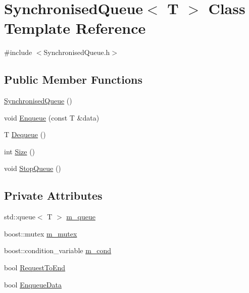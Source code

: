 \hypertarget{classSynchronisedQueue}{\section{\-Synchronised\-Queue$<$ \-T $>$ \-Class \-Template \-Reference}
\label{classSynchronisedQueue}
}


{\ttfamily \#include $<$\-Synchronised\-Queue.\-h$>$}

\subsection*{\-Public \-Member \-Functions}
\begin{DoxyCompactItemize}
\item 
\hyperlink{classSynchronisedQueue_af19aaa5e55bdcf1235f9fec42b8bd100}{\-Synchronised\-Queue} ()
\item 
void \hyperlink{classSynchronisedQueue_a57ab290483acce1df774ab57515c6fea}{\-Enqueue} (const \-T \&data)
\item 
\-T \hyperlink{classSynchronisedQueue_a9872d0bff96d46f32fe131454d17f1db}{\-Dequeue} ()
\item 
int \hyperlink{classSynchronisedQueue_ae1826dd6d56a0b1e07caed3a1215cd5a}{\-Size} ()
\item 
void \hyperlink{classSynchronisedQueue_aaf9850472417493364e6349f17558fac}{\-Stop\-Queue} ()
\end{DoxyCompactItemize}
\subsection*{\-Private \-Attributes}
\begin{DoxyCompactItemize}
\item 
std\-::queue$<$ \-T $>$ \hyperlink{classSynchronisedQueue_a838ae9b5d2b5ce8dd901aa7a03c79861}{m\-\_\-queue}
\item 
boost\-::mutex \hyperlink{classSynchronisedQueue_a94b11f8a9abb258e72162cc0988458ef}{m\-\_\-mutex}
\item 
boost\-::condition\-\_\-variable \hyperlink{classSynchronisedQueue_a9561fdd948fc105f361af18b1f58e875}{m\-\_\-cond}
\item 
bool \hyperlink{classSynchronisedQueue_af7a6fdab054a96999a930575cd62928f}{\-Request\-To\-End}
\item 
bool \hyperlink{classSynchronisedQueue_af6fe02819110807b9c562da12d19763b}{\-Enqueue\-Data}
\end{DoxyCompactItemize}


